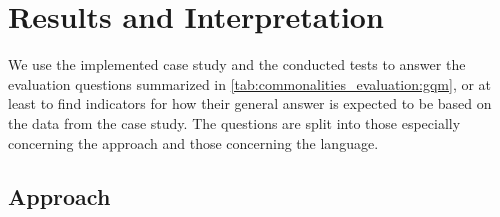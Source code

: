 






\section{Results and Interpretation}

We use the implemented case study and the conducted tests to answer the evaluation questions summarized in \autoref{tab:commonalities_evaluation:gqm}, or at least to find indicators for how their general answer is expected to be based on the data from the case study.
The questions are split into those especially concerning the \commonalities approach and those concerning the \commonalities language.

\subsection*{\Commonalities Approach}

